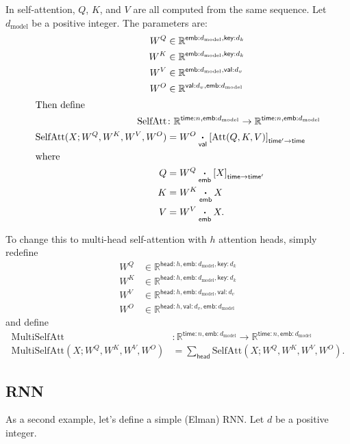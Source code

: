 \documentclass{article}
\newcommand{\name}[1]{\mathsf{#1}}
\newcommand{\ndot}[1]{\mathbin{\mathop{\thinspace\boldsymbol\cdot\thinspace}\displaylimits_{\name{#1}}}}
\newcommand{\dmodel}{d_{\text{model}}}
\begin{document}
In self-attention, $Q$, $K$, and $V$ are all computed from the same sequence.  Let $\dmodel$ be a positive integer. The parameters are:
\begin{align*}
  W^Q &\in \mathbb{R}^{\name{emb}:\dmodel, \name{key}:d_k} \\
  W^K &\in \mathbb{R}^{\name{emb}:\dmodel, \name{key}:d_k} \\
  W^V &\in \mathbb{R}^{\name{emb}:\dmodel, \name{val}:d_v} \\
  W^O &\in \mathbb{R}^{\name{val}:d_v, \name{emb}:\dmodel} \\
\intertext{Then define}
  \text{SelfAtt} &\colon \mathbb{R}^{\name{time}:n,\name{emb}:\dmodel} \rightarrow \mathbb{R}^{\name{time}:n,\name{emb}:\dmodel} \\
  \text{SelfAtt}(X; W^Q, W^K, W^V, W^O) &= W^O \ndot{val} \left[\text{Att}(Q, K, V)\right]_{\name{time'}\rightarrow\name{time}} \\
\intertext{where}
  Q &= W^Q \ndot{emb} \left[X\right]_{\name{time}\rightarrow\name{time'}} \\
  K &= W^K \ndot{emb} X \\
  V &= W^V \ndot{emb} X.
\end{align*}

To change this to multi-head self-attention with $h$ attention heads, simply redefine 
\begin{align*}
  W^Q &\in \mathbb{R}^{\name{head}:h, \name{emb}:\dmodel, \name{key}:d_k} \\
  W^K &\in \mathbb{R}^{\name{head}:h, \name{emb}:\dmodel, \name{key}:d_k} \\
  W^V &\in \mathbb{R}^{\name{head}:h, \name{emb}:\dmodel, \name{val}:d_v} \\
  W^O &\in \mathbb{R}^{\name{head}:h, \name{val}:d_v, \name{emb}:\dmodel}
\end{align*}
and define
\begin{align*}
\text{MultiSelfAtt} &\colon \mathbb{R}^{\name{time}:n,\name{emb}:\dmodel} \rightarrow \mathbb{R}^{\name{time}:n,\name{emb}:\dmodel} \\
\text{MultiSelfAtt}(X; W^Q, W^K, W^V, W^O) &= \sum_{\name{head}} \text{SelfAtt}(X; W^Q, W^K, W^V, W^O).
\end{align*}

\subsection{RNN}
\label{sec:rnn}

As a second example, let's define a simple (Elman) RNN. Let $d$ be a positive integer.
\end{document}

